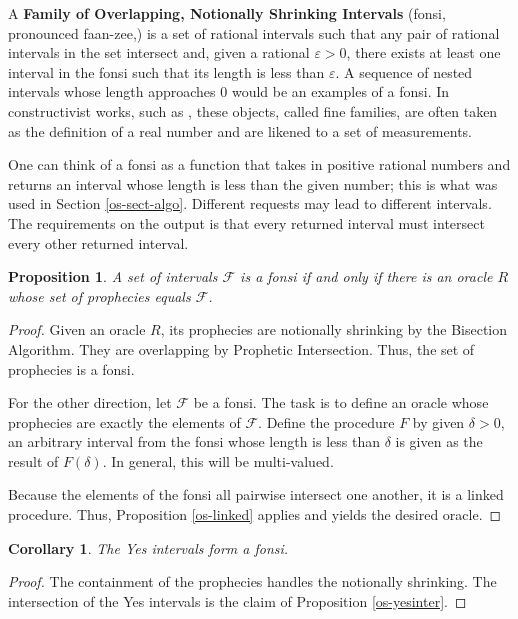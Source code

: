 \documentclass[12pt]{article}
\newtheorem{corollary}{Corollary}[section]
\newtheorem{proposition}{Proposition}[section]
\begin{document}
 A \textbf{Family of Overlapping, Notionally Shrinking Intervals} (fonsi, pronounced faan-zee,) is a set of rational intervals such that any pair of rational intervals in the set intersect and, given a rational $\varepsilon >0$, there exists at least one interval in the fonsi such that its length is less than $\varepsilon$. A sequence of nested intervals whose length approaches $0$ would be an  examples of a fonsi. In constructivist works, such as \cite{bridger}, these objects, called fine families, are often taken as the definition of a real number and are likened to a set of measurements. 

One can think of a fonsi as a function that takes in positive rational numbers and returns an interval whose length is less than the given number; this is what was used in Section \ref{os-sect-algo}. Different requests may lead to different intervals. The requirements on the output is that every returned interval must intersect every other returned interval. 

\begin{proposition}
    A set of intervals $\mathcal{F}$ is a fonsi if and only if there is an oracle $R$ whose set of prophecies equals $\mathcal{F}$.
\end{proposition}

\begin{proof}
    Given an oracle $R$, its prophecies are notionally shrinking by the Bisection Algorithm. They are overlapping by Prophetic Intersection. Thus, the set of prophecies is a fonsi. 

    For the other direction, let $\mathcal{F}$ be a fonsi. The task is to define an oracle whose prophecies are exactly the elements of $\mathcal{F}$. Define the procedure $F$ by given $\delta >0$, an arbitrary interval from the fonsi whose length is less than $\delta$ is given as the result of $F(\delta)$. In general, this will be multi-valued. 

    Because the elements of the fonsi all pairwise intersect one another, it is a linked procedure. Thus, Proposition \ref{os-linked} applies and yields the desired oracle. 
\end{proof}

\begin{corollary}
    The Yes intervals form a fonsi. 
\end{corollary}

\begin{proof}
    The containment of the prophecies handles the notionally shrinking. The intersection of the Yes intervals is the claim of Proposition \ref{os-yesinter}.
\end{proof}
\end{document}
